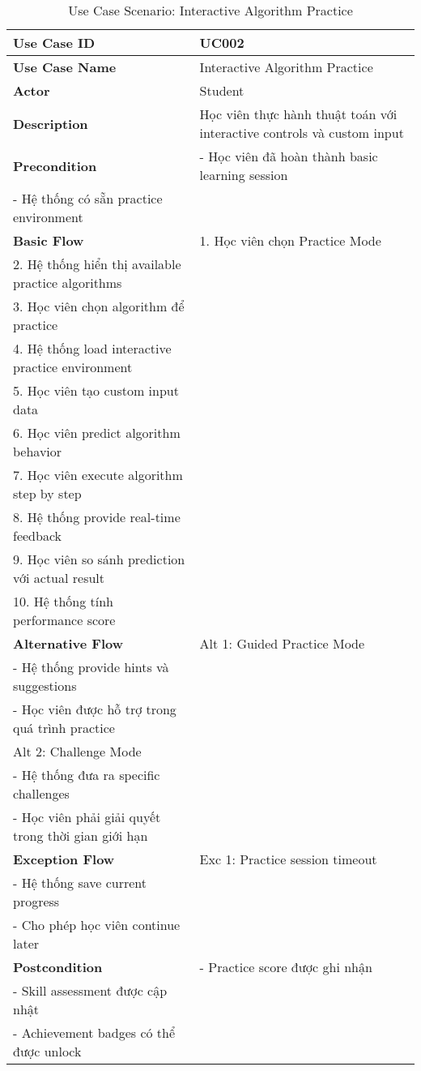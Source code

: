 \begin{table}[H]
\centering
\begin{tabular}{|p{3cm}|p{10cm}|}
\hline
\textbf{Use Case ID} & UC002 \\
\hline
\textbf{Use Case Name} & Interactive Algorithm Practice \\
\hline
\textbf{Actor} & Student \\
\hline
\textbf{Description} & Học viên thực hành thuật toán với interactive controls và custom input \\
\hline
\textbf{Precondition} & 
- Học viên đã hoàn thành basic learning session \\
- Hệ thống có sẵn practice environment \\
\hline
\textbf{Basic Flow} & 
1. Học viên chọn Practice Mode \\
2. Hệ thống hiển thị available practice algorithms \\
3. Học viên chọn algorithm để practice \\
4. Hệ thống load interactive practice environment \\
5. Học viên tạo custom input data \\
6. Học viên predict algorithm behavior \\
7. Học viên execute algorithm step by step \\
8. Hệ thống provide real-time feedback \\
9. Học viên so sánh prediction với actual result \\
10. Hệ thống tính performance score \\
\hline
\textbf{Alternative Flow} & 
Alt 1: Guided Practice Mode \\
- Hệ thống provide hints và suggestions \\
- Học viên được hỗ trợ trong quá trình practice \\
Alt 2: Challenge Mode \\
- Hệ thống đưa ra specific challenges \\
- Học viên phải giải quyết trong thời gian giới hạn \\
\hline
\textbf{Exception Flow} & 
Exc 1: Practice session timeout \\
- Hệ thống save current progress \\
- Cho phép học viên continue later \\
\hline
\textbf{Postcondition} & 
- Practice score được ghi nhận \\
- Skill assessment được cập nhật \\
- Achievement badges có thể được unlock \\
\hline
\end{tabular}
\caption{Use Case Scenario: Interactive Algorithm Practice}
\label{tab:uc002}
\end{table}

